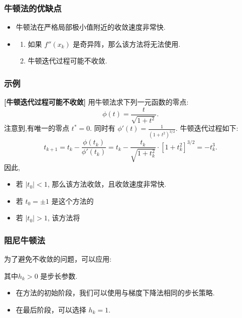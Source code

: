 \documentclass[handout,10pt]{beamer} %
\begin{document}
\begin{frame}[fragile]
\frametitle{牛顿法的优缺点}


\begin{itemize}
  \item {}   牛顿法在严格局部极小值附近的收敛速度非常快.

  \item {}
\begin{enumerate}
\item 如果 $f''(x_k)$ 是奇异阵，那么该方法将无法使用.
\item 牛顿迭代过程可能不收敛.
\end{enumerate}
\end{itemize}

\end{frame}

\begin{frame}[fragile]
\frametitle{示例}

\begin{example}[示例]\label{eg_1_2_4}
\textbf{[牛顿迭代过程可能不收敛]}
用牛顿法求下列一元函数的零点:
$$
    \phi(t) = \frac{t}{\sqrt{1+t^2}}.
$$
注意到,有唯一的零点 $t^* = 0$. 同时有
$
    \phi'(t) = \frac{1}{(1 + t^2)^{3/2}}.
$
牛顿迭代过程如下:
$$
    t_{k+1}^{} = t_k - \frac{\phi(t_k)}{\phi'(t_k)}  = t_k - \frac{t_k}{\sqrt{1+t_k^2}}\cdot [1+t_k^2]^{3/2} = -t_k^3.
$$
因此,
\begin{itemize}
\item 若 $|t_0|<1$, 那么该方法收敛，且收敛速度非常快.
\item 若 $t_0 = \pm 1$ 是这个方法的 
\item 若 $|t_0|>1$, 该方法将 
\end{itemize}
\end{example}


\end{frame}

\begin{frame}[fragile]
\frametitle{阻尼牛顿法}



为了避免不收敛的问题，可以应用:
\begin{center}
\end{center}
其中$h_k >0$ 是步长参数.

\begin{itemize}
  \item
在方法的初始阶段，我们可以使用与梯度下降法相同的步长策略.

\item 在最后阶段，可以选择 $h_k = 1$.

\end{itemize}



\end{frame}
\end{document}
